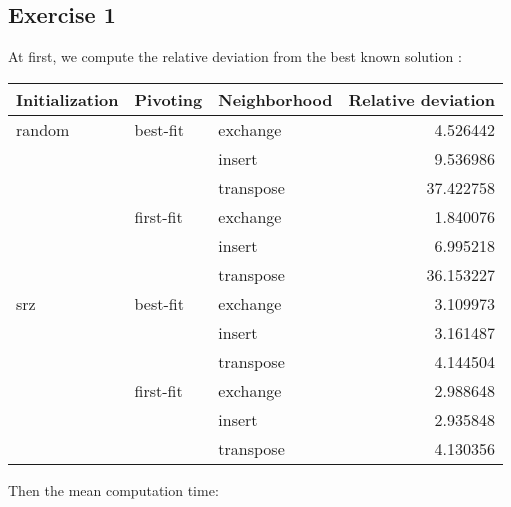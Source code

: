 \documentclass[a4paper]{article}
\begin{document}
\subsection{Exercise 1}

At first, we compute the relative deviation from the best known solution :

\begin{center}
\begin{tabular}{lllr}
\toprule
Initialization & Pivoting & Neighborhood & Relative deviation \\
\midrule
random & best-fit & exchange &       4.526442 \\
       &      & insert &       9.536986 \\
       &      & transpose &      37.422758 \\
       & first-fit & exchange &       1.840076 \\
       &      & insert &       6.995218 \\
       &      & transpose &      36.153227 \\
srz & best-fit & exchange &       3.109973 \\
       &      & insert &       3.161487 \\
       &      & transpose &       4.144504 \\
       & first-fit & exchange &       2.988648 \\
       &      & insert &       2.935848 \\
       &      & transpose &       4.130356 \\
\bottomrule
\end{tabular}
\end{center}

Then the mean computation time:
\end{document}
